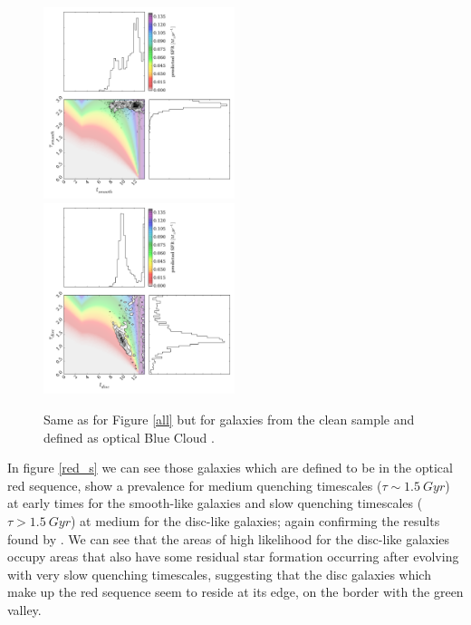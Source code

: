 \documentclass{mn2e}
\begin{document}
\begin{figure}
\includegraphics[width=0.4975\textwidth]{blue_c_smooth_clean.pdf}
\includegraphics[width=0.4975\textwidth]{blue_c_disc_clean.pdf}
\caption{Same as for Figure \ref{all} but for galaxies from the clean sample and defined as optical Blue Cloud \cite{Baldry}.}
\label{blue_c_clean}
\end{figure}


In figure \ref{red_s} we can see those galaxies which are defined to be in the optical red sequence, show a prevalence for medium quenching timescales ($\tau \sim1.5~Gyr$) at early times for the smooth-like galaxies and slow quenching timescales ($\tau > 1.5~Gyr$) at medium for the disc-like galaxies; again confirming the results found by \citet{Sch2014}. We can see that the areas of high likelihood for the disc-like galaxies occupy areas that also have some residual star formation occurring after evolving with very slow quenching timescales, suggesting that the disc galaxies which make up the red sequence seem to reside at its edge, on the border with the green valley. 
\end{document}
